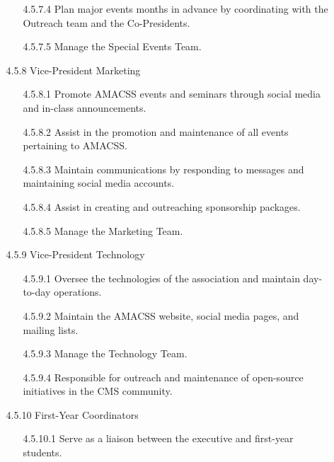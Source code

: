 \documentclass[12pt,a4paper]{article}
\begin{document}
\begin{enumerate}
\begin{enumerate}
\begin{enumerate}
\item[4.5.7.4] Plan major events months in advance by coordinating with the Outreach team and the Co-Presidents.

\item[4.5.7.5] Manage the Special Events Team.
\end{enumerate}

\item[4.5.8] Vice-President Marketing

\begin{enumerate}
\item[4.5.8.1] Promote AMACSS events and seminars through social media and in-class announcements.

\item[4.5.8.2] Assist in the promotion and maintenance of all events pertaining to AMACSS.

\item[4.5.8.3] Maintain communications by responding to messages and maintaining social media accounts.

\item[4.5.8.4] Assist in creating and outreaching sponsorship packages.

\item[4.5.8.5] Manage the Marketing Team.
\end{enumerate}

\item[4.5.9] Vice-President Technology

\begin{enumerate}
\item[4.5.9.1] Oversee the technologies of the association and maintain day-to-day operations.

\item[4.5.9.2] Maintain the AMACSS website, social media pages, and mailing lists.

\item[4.5.9.3] Manage the Technology Team.

\item[4.5.9.4] Responsible for outreach and maintenance of open-source initiatives in the CMS community.
\end{enumerate}

\item[4.5.10] First-Year Coordinators

\begin{enumerate}
\item[4.5.10.1] Serve as a liaison between the executive and first-year students.


\end{enumerate}
\end{enumerate}
\end{enumerate}
\end{document}
